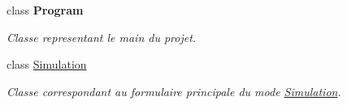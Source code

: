 \begin{DoxyCompactItemize}
class {\bfseries Program}
\begin{DoxyCompactList}\small\item\em Classe representant le main du projet. \end{DoxyCompactList}\item 
class \hyperlink{class_interface_graphique_1_1_simulation}{Simulation}
\begin{DoxyCompactList}\small\item\em Classe correspondant au formulaire principale du mode \hyperlink{class_interface_graphique_1_1_simulation}{Simulation}. \end{DoxyCompactList}\end{DoxyCompactItemize}

